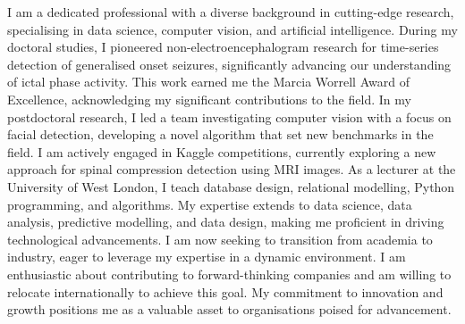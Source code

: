 

\begin{cvparagraph}

I am a dedicated professional with a diverse background in cutting-edge research, specialising in data science, computer vision, and artificial intelligence. During my doctoral studies, I pioneered non-electroencephalogram research for time-series detection of generalised onset seizures, significantly advancing our understanding of ictal phase activity. This work earned me the Marcia Worrell Award of Excellence, acknowledging my significant contributions to the field. In my postdoctoral research, I led a team investigating computer vision with a focus on facial detection, developing a novel algorithm that set new benchmarks in the field. I am actively engaged in Kaggle competitions, currently exploring a new approach for spinal compression detection using MRI images. As a lecturer at the University of West London, I teach database design, relational modelling, Python programming, and algorithms. My expertise extends to data science, data analysis, predictive modelling, and data design, making me proficient in driving technological advancements. I am now seeking to transition from academia to industry, eager to leverage my expertise in a dynamic environment. I am enthusiastic about contributing to forward-thinking companies and am willing to relocate internationally to achieve this goal. My commitment to innovation and growth positions me as a valuable asset to organisations poised for advancement.


\end{cvparagraph}
